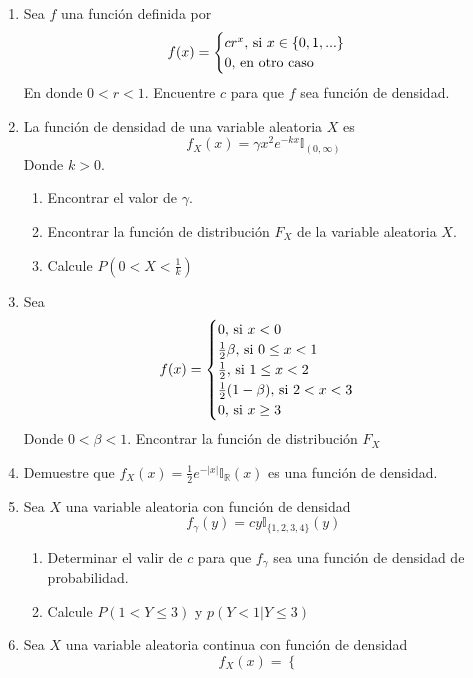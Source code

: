 \documentclass[12pt,a4paper]{report}
\begin{document}
\begin{enumerate}
{\begin{enumerate}
{					
				}
			\end{enumerate}
		}
		\item {
			Sea $f$ una función definida por
			\[
				f(x) = \begin{cases}
								cr^x, $ si $ x \in \{0, 1, ...\}\\
								0, $ en otro caso$
							 \end{cases}
			\]
			En donde $0 < r < 1$. Encuentre $c$ para que $f$ sea función de densidad.
		}
		\item {
		La función de densidad de una variable aleatoria $X$ es
		\[f_X(x) = \gamma x^2 e^{-kx}\mathbb{I}_{(0, \infty)}\]
		Donde $k > 0$.
		\begin{enumerate}
			\item {
				Encontrar el valor de $\gamma$.
			}
			\item {
				Encontrar la función de distribución $F_X$ de la variable aleatoria
				$X$.
			}
			\item {
				Calcule $P(0 < X < \frac{1}{k})$
			}
		\end{enumerate}
		}
		\item {
			Sea
			\[
				f(x) = \begin{cases}
								0, $ si $ x < 0\\
								\frac{1}{2}\beta, $ si $ 0 \leq x < 1\\
								\frac{1}{2}, $ si $ 1 \leq x < 2\\
								\frac{1}{2}(1-\beta), $ si $ 2 < x < 3\\
								0, $ si $ x \geq 3
						 	 \end{cases}
			\]
			Donde $0 < \beta < 1$. Encontrar la función de distribución $F_X$
		}
		\item {
			Demuestre que $f_X(x) = \frac{1}{2}e^{-|x|}\mathbb{I}_\mathbb{R}(x)$ es
			una función de densidad.
		}
		\item {
			Sea $X$ una variable aleatoria con función de densidad
				\[f_\gamma(y) = cy \mathbb{I}_{\{1, 2, 3, 4\}}(y)\]
				\begin{enumerate}
					\item {
						Determinar el valir de $c$ para que $f_\gamma$ sea una función de
						densidad de probabilidad.
					}
					\item {
						Calcule $P(1 < Y \leq 3)$ y $p(Y < 1 | Y \leq 3)$
					}
				\end{enumerate}
		}
		\item {
			Sea $X$ una variable aleatoria continua con función de densidad
				\[
					f_X(x) = \begin{cases}

\end{cases}\]}
\end{enumerate}
\end{document}
